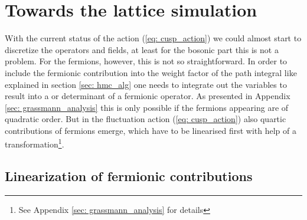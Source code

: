 \chapter{Towards the lattice simulation}
\label{sec: towards_lat}
With the current status of the action (\ref{eq: cusp_action}) we could almost start to discretize the operators and fields, at least for the bosonic part this is not a problem. For the fermions, however, this is not so straightforward. In order to include the fermionic contribution into the weight factor of the path integral like explained in section \ref{sec: hmc_alg} one needs to integrate out the  variables to result into a  or determinant of a fermionic operator. As presented in Appendix \ref{sec: grassmann_analysis} this is only possible if the fermions appearing are of quadratic order. But in the fluctuation action (\ref{eq: cusp_action}) also quartic contributions of fermions emerge, which have to be linearised first with help of a  transformation\footnote{See Appendix \ref{sec: grassmann_analysis} for details}.
%
%
%
%
%
%
\section{Linearization of fermionic contributions}
